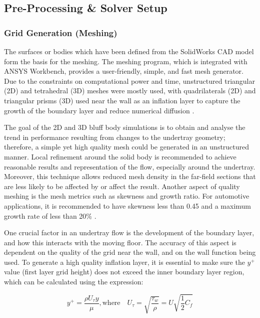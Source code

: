 \subsection{Pre-Processing \& Solver Setup}

\subsubsection{Grid Generation (Meshing)}
\noindent The surfaces or bodies which have been defined from the SolidWorks CAD model form the basis for the meshing. The meshing program, which is integrated with ANSYS Workbench, provides a user-friendly, simple, and fast mesh generator. Due to the constraints on computational power and time, unstructured triangular (2D) and tetrahedral (3D) meshes were mostly used, with quadrilaterals (2D) and triangular prisms (3D) used near the wall as an inflation layer to capture the growth of the boundary layer and reduce numerical diffusion \cite{Lanfrit2005BestFLUENT}.

\noindent The goal of the 2D and 3D bluff body simulations is to obtain and analyse the trend in performance resulting from changes to the undertray geometry; therefore, a simple yet high quality mesh could be generated in an unstructured manner. Local refinement around the solid body is recommended \cite{Lanfrit2005BestFLUENT} to achieve reasonable results and representation of the flow, especially around the undertray. Moreover, this technique allows reduced mesh density in the far-field sections that are less likely to be affected by or affect the result. Another aspect of quality meshing is the mesh metrics such as skewness and growth ratio. For automotive applications, it is recommended to have skewness less than 0.45 and a maximum growth rate of less than 20\% \cite{Lanfrit2005BestFLUENT}. 

\noindent One crucial factor in an undertray flow is the development of the boundary layer, and how this interacts with the moving floor. The accuracy of this aspect is dependent on the quality of the grid near the wall, and on the wall function being used. To generate a high quality inflation layer, it is essential to make sure the $y^+$ value (first layer grid height) does not exceed the inner boundary layer region, which can be calculated using the expression:

\begin{equation}
    y^+ = \frac{\rho U_\tau y}{\mu}, \text{where}\quad U_\tau = \sqrt{\frac{\tau_w}{\rho}} = U \sqrt{\frac{1}{2}C_f}
\end{equation}

